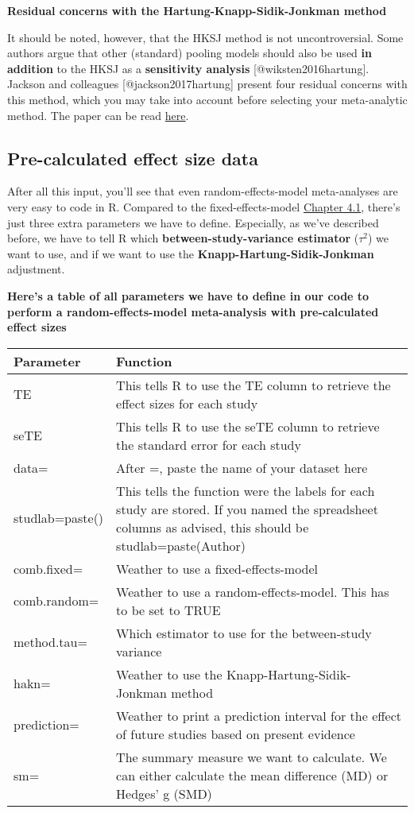 \documentclass[]{book}
\theoremstyle{definition}
\theoremstyle{definition}
\theoremstyle{definition}
\theoremstyle{remark}
\begin{document}
\begin{rmdachtung}
\textbf{Residual concerns with the Hartung-Knapp-Sidik-Jonkman method}

It should be noted, however, that the HKSJ method is not
uncontroversial. Some authors argue that other (standard) pooling models
should also be used \textbf{in addition} to the HKSJ as a
\textbf{sensitivity analysis} {[}@wiksten2016hartung{]}. Jackson and
colleagues {[}@jackson2017hartung{]} present four residual concerns with
this method, which you may take into account before selecting your
meta-analytic method. The paper can be read
\href{https://onlinelibrary.wiley.com/doi/pdf/10.1002/sim.7411}{here}.
\end{rmdachtung}

\hypertarget{random.precalc}{\subsection{Pre-calculated effect size
data}\label{random.precalc}}

After all this input, you'll see that even random-effects-model
meta-analyses are very easy to code in R. Compared to the
fixed-effects-model \protect\hyperlink{fixed}{Chapter 4.1}, there's just
three extra parameters we have to define. Especially, as we've described
before, we have to tell R which \textbf{between-study-variance
estimator} (\(\tau^{2}\)) we want to use, and if we want to use the
\textbf{Knapp-Hartung-Sidik-Jonkman} adjustment.

\textbf{Here's a table of all parameters we have to define in our code
to perform a random-effects-model meta-analysis with pre-calculated
effect sizes}

\begin{tabular}{l|l}
\hline
Parameter & Function\\
\hline
TE & This tells R to use the TE column to retrieve the effect sizes for each study\\
\hline
seTE & This tells R to use the seTE column to retrieve the standard error for each             study\\
\hline
data= & After =, paste the name of your dataset here\\
\hline
studlab=paste() & This tells the function were the labels for each study are stored. If you named the spreadsheet columns as advised, this should be studlab=paste(Author)\\
\hline
comb.fixed= & Weather to use a fixed-effects-model\\
\hline
comb.random= & Weather to use a random-effects-model. This has to be set to TRUE\\
\hline
method.tau= & Which estimator to use for the between-study variance\\
\hline
hakn= & Weather to use the Knapp-Hartung-Sidik-Jonkman method\\
\hline
prediction= & Weather to print a prediction interval for the effect of future studies based on present evidence\\
\hline
sm= & The summary measure we want to calculate. We can either calculate the mean difference (MD) or Hedges' g (SMD)\\
\hline
\end{tabular}
\end{document}
